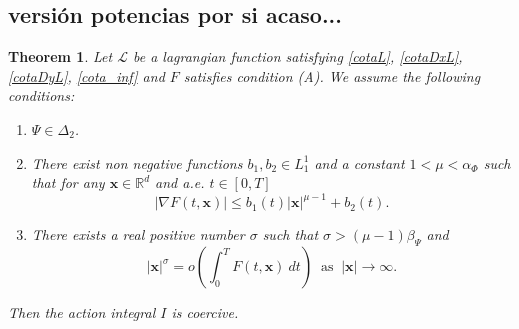 \documentclass[twoside]{article}
\newtheorem{thm}{Theorem}[section]
\theoremstyle{remark}
\renewcommand{\b}[1]{\boldsymbol{#1}}
\newcommand{\rr}{\mathbb{R}}
\renewcommand{\leq}{\leqslant}
\begin{document}
\subsection{versi\'on potencias por si acaso...} 
\begin{thm}\label{coercitividad-r}
Let  $\mathcal{L}$ be a lagrangian function satisfying \eqref{cotaL}, \eqref{cotaDxL}, \eqref{cotaDyL}, \eqref{cota_inf}  and $F$ satisfies condition (A). We assume the following conditions:
\begin{enumerate}
\item $\Psi\in\Delta_2$.
\item There exist  non negative functions  $b_1,b_2 \in L^1_1$ and a constant $1<\mu<\alpha_{\Phi}$  such that 
for any $\b{x}\in\rr^d$ and a.e. $t\in [0,T]$
\begin{equation}\label{holder_cont-mu}
  \left| \nabla F(t,\b{x}) \right|\leq b_1(t)|\b{x}|^{\mu-1}+b_2(t).
\end{equation}
\item There exists a real positive number $\sigma$ such that $\sigma>(\mu-1)\beta_{\Psi}$ and
\begin{equation}\label{propiedad-coercividad-sigma}
|\b{x}|^{\sigma}=o\left(\int_{0}^{T}F(t,\b{x})\ dt\right)\;\;\mbox{as}\;\;|\b{x}|\to \infty.
\end{equation}
\end{enumerate}
Then  the action integral $I$ is coercive.
\end{thm}
\end{document}
